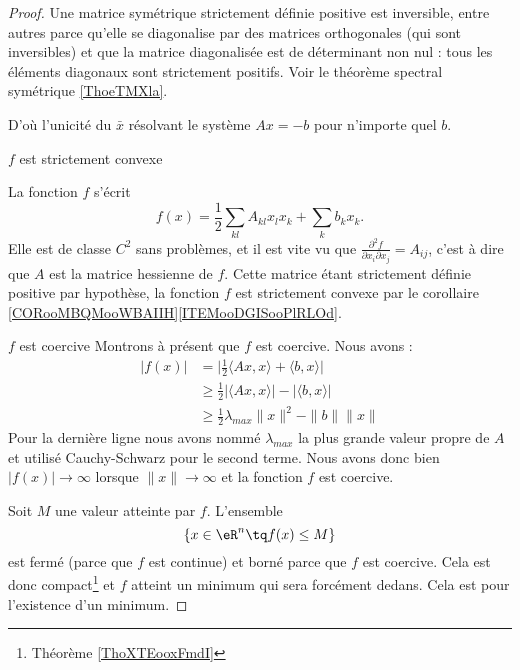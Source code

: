 \begin{proof}

    Une matrice symétrique strictement définie positive est inversible, entre autres parce qu'elle se diagonalise par des matrices orthogonales (qui sont inversibles) et que la matrice diagonalisée est de déterminant non nul : tous les éléments diagonaux sont strictement positifs. Voir le théorème spectral symétrique \ref{ThoeTMXla}.

    D'où l'unicité du \( \bar x\) résolvant le système \( Ax=-b\) pour n'importe quel \( b\).

    \begin{subproof}
    \item[\( f\) est strictement convexe]
        
        La fonction \( f\) s'écrit
    \begin{equation}
        f(x)=\frac{ 1 }{2}\sum_{kl}A_{kl}x_lx_k+\sum_kb_kx_k.
    \end{equation}
    Elle est de classe \( C^2\) sans problèmes, et il est vite vu que \( \frac{ \partial^2f }{ \partial x_i\partial x_j }=A_{ij}\), c'est à dire que \( A\) est la matrice hessienne de \( f\). Cette matrice étant strictement définie positive par hypothèse, la fonction \( f\) est strictement convexe par le corollaire \ref{CORooMBQMooWBAIIH}\ref{ITEMooDGISooPlRLOd}.

\item[\( f\) est coercive]
    Montrons à présent que \( f\) est coercive. Nous avons :
    \begin{subequations}
        \begin{align}
            | f(x) |&=\big| \frac{ 1 }{2}\langle Ax, x\rangle +\langle b, x\rangle  \big|\\
            &\geq\frac{ 1 }{2}| \langle Ax, x\rangle  |-| \langle b, x\rangle  |\\
            &\geq\frac{ 1 }{2}\lambda_{max}\| x \|^2-\| b \|\| x \|
        \end{align}
    \end{subequations}
    Pour la dernière ligne nous avons nommé \( \lambda_{max}\) la plus grande valeur propre de \( A\) et utilisé Cauchy-Schwarz pour le second terme. Nous avons donc bien \( | f(x) |\to \infty\) lorsque \( \| x \|\to\infty\) et la fonction \( f\) est coercive.
    \end{subproof}

    Soit \( M\) une valeur atteinte par \( f\). L'ensemble
    \begin{equation}
        \{ x\in \eR^n\tq f(x)\leq M \}
    \end{equation}
    est fermé (parce que \( f\) est continue) et borné parce que \( f\) est coercive. Cela est donc compact\footnote{Théorème \ref{ThoXTEooxFmdI}} et \( f\) atteint un minimum qui sera forcément dedans. Cela est pour l'existence d'un minimum.


\end{proof}
